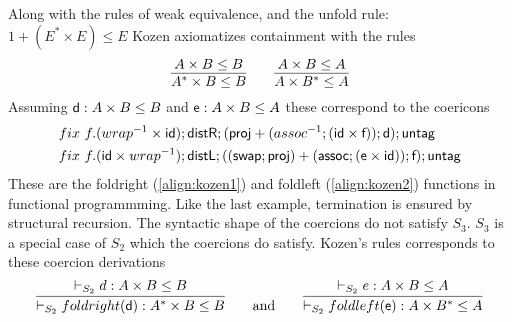 \documentclass[a4paper,UKenglish,cleveref, autoref, thm-restate]{lipics-v2021}
\begin{document}
\begin{example}[Kozen]
Along with the rules of weak equivalence, and the unfold rule: $1 + (E^* \times E) \leq E$ Kozen axiomatizes containment with the rules
\begin{displaymath}
\infer{A^* \times B \leq B}{A \times B \leq B} \qquad \infer{A \times B^* \leq A}{A \times B \leq A}
\end{displaymath}
Assuming $\textsf{d} : A \times B \leq B $ and $\textsf{e} : A \times B \leq A $ these correspond to the coericons
\begin{align}
&\fix~f.(\dslcominv{wrap}\times \dslcom{id}); \dslcom{distR};(\dslcom{proj} + (\dslcominv{assoc};(\dslcom{id} \times \dslcom{f}));\dslcom{d});\dslcom{untag}\label{align:kozen1}\\
&\fix~f.( \dslcom{id} \times \dslcominv{wrap}); \dslcom{distL};((\dslcom{swap};\dslcom{proj}) + (\dslcom{assoc};(\dslcom{e} \times \dslcom{id}));\dslcom{f});\dslcom{untag}\label{align:kozen2}
\end{align}
These are the \textsf{foldright} (\ref{align:kozen1}) and \textsf{foldleft} (\ref{align:kozen2}) functions in functional programmming. Like the last example, termination is ensured by structural recursion. The syntactic shape of the coercions do not satisfy $S_3$. $S_3$ is a special case of $S_2$ which the coercions do satisfy. Kozen's rules corresponds to these coercion derivations
\[ \infer{\containsP{}{\mathsf{foldright}(\dslcom{d})}{A^* \times B}{B}{S_2}}{\containsP{}{d}{A \times B}{B}{S_2}} \qquad \text{and} \qquad  \infer{\containsP{}{\mathsf{foldleft}(\dslcom{e})}{A \times B^*}{A}{S_2}}{\containsP{}{e}{A \times B}{A}{S_2}} \]


\end{example}
\end{document}
